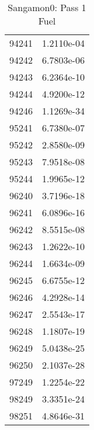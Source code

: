 \begin{table}[h!]
\begin{tabular}{|| c || c |}
94241 & 1.2110e-04 \\
94242 & 6.7803e-06 \\
94243 & 6.2364e-10 \\
94244 & 4.9200e-12 \\
94246 & 1.1269e-34 \\
95241 & 6.7380e-07 \\
95242 & 2.8580e-09 \\
95243 & 7.9518e-08 \\
95244 & 1.9965e-12 \\
96240 & 3.7196e-18 \\
96241 & 6.0896e-16 \\
96242 & 8.5515e-08 \\
96243 & 1.2622e-10 \\
96244 & 1.6634e-09 \\
96245 & 6.6755e-12 \\
96246 & 4.2928e-14 \\
96247 & 2.5543e-17 \\
96248 & 1.1807e-19 \\
96249 & 5.0438e-25 \\
96250 & 2.1037e-28 \\
97249 & 1.2254e-22 \\
98249 & 3.3351e-24 \\
98251 & 4.8646e-31 \\

\hline
\end{tabular}
\caption{Sangamon0: Pass 1 Fuel}
\label{table:sang0p1fuel}
\end{table}